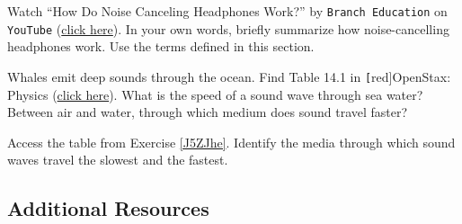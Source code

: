 \documentclass{article}
\numberwithin{equation}{section}
\numberwithin{figure}{section}
\begin{document}
\begin{exercise}
    Watch ``How Do Noise Canceling Headphones Work?'' by \texttt{Branch Education} on \texttt{YouTube} (\href{https://youtu.be/VIi04uD8LtY}{click here}). In your own words, briefly summarize how noise-cancelling headphones work. Use the terms defined in this section.
\end{exercise}

\begin{exercise} \label{J5ZJhe}
    Whales emit deep sounds through the ocean. Find Table 14.1 in \texttt[red]{OpenStax: Physics} (\href{https://openstax.org/books/physics/pages/14-1-speed-of-sound-frequency-and-wavelength#Table_14_01}{click here}). What is the speed of a sound wave through sea water? Between air and water, through which medium does sound travel faster?
\end{exercise}

\begin{exercise}
    Access the table from Exercise \ref{J5ZJhe}. Identify the media through which sound waves travel the slowest and the fastest.
\end{exercise}







\clearpage

\subsection*{Additional Resources}
\end{document}
